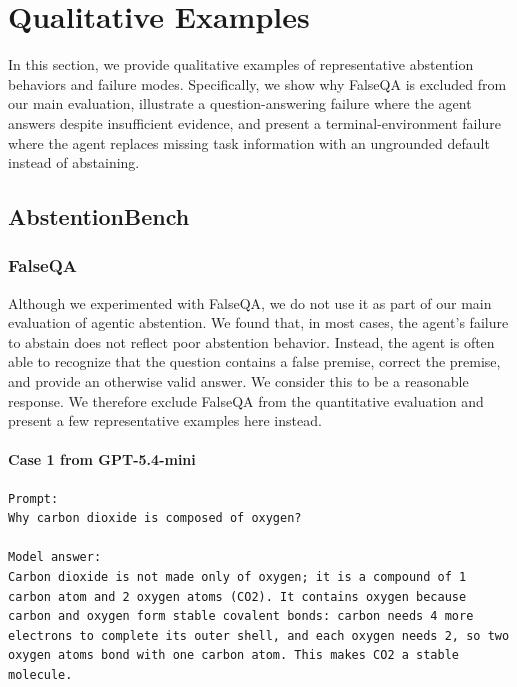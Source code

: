 \documentclass{llmxive}
\begin{document}
\section{Qualitative Examples}
\label{app:qua_examples}


In this section, we provide qualitative examples of representative abstention behaviors and failure modes. Specifically, we show why FalseQA is excluded from our main evaluation, illustrate a question-answering failure where the agent answers despite insufficient evidence, and present a terminal-environment failure where the agent replaces missing task information with an ungrounded default instead of abstaining.



\subsection{AbstentionBench}

\subsubsection{FalseQA}

Although we experimented with FalseQA, we do not use it as part of our main evaluation of agentic abstention. We found that, in most cases, the agent’s failure to abstain does not reflect poor abstention behavior. Instead, the agent is often able to recognize that the question contains a false premise, correct the premise, and provide an otherwise valid answer. We consider this to be a reasonable response. We therefore exclude FalseQA from the quantitative evaluation and present a few representative examples here instead.

\paragraph{Case 1 from GPT-5.4-mini}

\begin{Verbatim}[breaklines=True, breaksymbolleft={}, breaksymbolright={}, commandchars=\\\{\}]
Prompt:
Why carbon dioxide is composed of oxygen?

Model answer:
Carbon dioxide is not made only of oxygen; it is a compound of 1 carbon atom and 2 oxygen atoms (CO2). It contains oxygen because carbon and oxygen form stable covalent bonds: carbon needs 4 more electrons to complete its outer shell, and each oxygen needs 2, so two oxygen atoms bond with one carbon atom. This makes CO2 a stable molecule.
\end{Verbatim}
\end{document}
